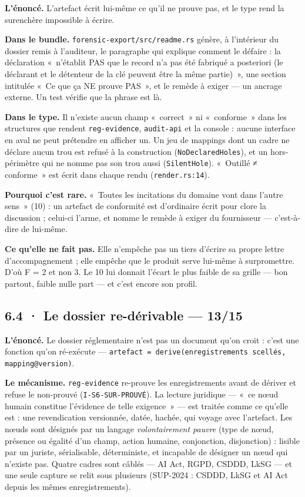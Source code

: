 \documentclass[10pt]{article}
\newcommand{\code}[1]{\texttt{\small #1}}
\newcommand{\loc}[1]{{\footnotesize\color{grey}\texttt{#1}}}
\begin{document}
\begin{these}
\textbf{L'énoncé.} L'artefact écrit lui-même ce qu'il ne prouve pas, et le type rend la surenchère impossible à
écrire.
\end{these}

\textbf{Dans le bundle.} \code{forensic-export/src/readme.rs} génère, à l'intérieur du dossier remis à l'auditeur, le
paragraphe qui explique comment le défaire : la déclaration «~n'établit PAS que le record n'a pas été fabriqué a
posteriori (le déclarant et le détenteur de la clé peuvent être la même partie)~», une section intitulée «~Ce que ça
NE prouve PAS~», et le remède à exiger --- un ancrage externe. Un test vérifie que la phrase est là.

\textbf{Dans le type.} Il n'existe aucun champ «~correct~» ni «~conforme~» dans les structures que rendent
\code{reg-evidence}, \code{audit-api} et la console : aucune interface en aval ne peut prétendre en afficher un. Un
jeu de mappings dont un cadre ne déclare aucun trou est refusé à la construction (\code{NoDeclaredHoles}), et un
hors-périmètre qui ne nomme pas son trou aussi (\code{SilentHole}). «~Outillé ≠ conforme~» est écrit dans chaque
rendu (\loc{render.rs:14}).

\textbf{Pourquoi c'est rare.} «~Toutes les incitations du domaine vont dans l'autre sens~» (10) : un artefact de
conformité est d'ordinaire écrit pour clore la discussion ; celui-ci l'arme, et nomme le remède à exiger du
fournisseur --- c'est-à-dire de lui-même.

\textbf{Ce qu'elle ne fait pas.} Elle n'empêche pas un tiers d'écrire sa propre lettre d'accompagnement ; elle empêche
que le produit serve lui-même à surpromettre. D'où F = 2 et non 3. Le 10 lui donnait l'écart le plus faible de sa
grille --- bon partout, faible nulle part --- et c'est encore son profil.

\subsection{6.4 · Le dossier re-dérivable --- 13/15}

\begin{these}
\textbf{L'énoncé.} Le dossier réglementaire n'est pas un document qu'on croit : c'est une fonction qu'on
ré-exécute --- \code{artefact = derive(enregistrements scellés, mapping@version)}.
\end{these}

\textbf{Le mécanisme.} \code{reg-evidence} re-prouve les enregistrements avant de dériver et refuse le non-prouvé
(\code{I-S6-\allowbreak SUR-PROUVÉ}). La lecture juridique --- «~ce nœud humain constitue l'évidence de telle exigence~» --- est
traitée comme ce qu'elle est : une revendication versionnée, datée, hachée, qui voyage avec l'artefact. Les nœuds
sont désignés par un langage \emph{volontairement pauvre} (type de nœud, présence ou égalité d'un champ, action
humaine, conjonction, disjonction) : lisible par un juriste, sérialisable, déterministe, et incapable de désigner un
nœud qui n'existe pas. Quatre cadres sont câblés --- AI Act, RGPD, CSDDD, LkSG --- et une seule capture se relit sous
plusieurs (SUP-2024 : CSDDD, LkSG et AI Act depuis les mêmes enregistrements).
\end{document}
